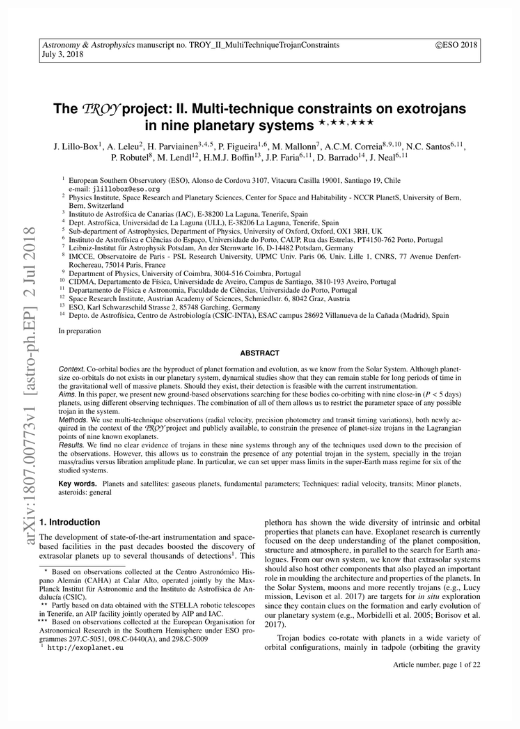 { 
 {\includegraphics[width=.9\textwidth,keepaspectratio=true,page = 1, trim = 1.3cm 1cm 1.3cm 1cm, clip = true]{appendices/papers/Lillo-Box2018.pdf}}
}
